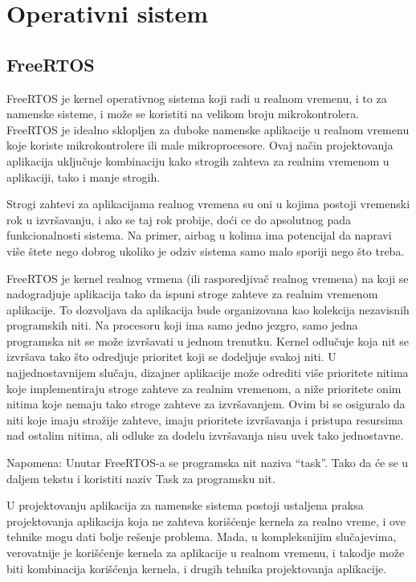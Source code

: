 \documentclass[a4paper,12pt, master]{etf}
\begin{document}
	\chapter{Operativni sistem}

	\section{FreeRTOS}

	FreeRTOS je kernel operativnog sistema koji radi u realnom vremenu, i to za
	namenske sisteme, i mo\v{z}e se koristiti na velikom broju mikrokontrolera.
	FreeRTOS je idealno sklopljen za duboke namenske aplikacije u realnom
	vremenu koje koriste mikrokontrolere ili male mikroprocesore. Ovaj
	na\v{c}in projektovanja aplikacija uklju\v{c}uje kombinaciju kako strogih
	zahteva za realnim vremenom u aplikaciji, tako i manje strogih.

	Strogi zahtevi za aplikacijama realnog vremena su oni u kojima postoji
	vremenski rok u	izvr\v{s}avanju, i ako se taj rok probije, do\'{c}i ce do
	apsolutnog pada funkcionalnosti sistema. Na primer, airbag u kolima ima
	potencijal da napravi vi\v{s}e \v{s}tete nego dobrog ukoliko je	odziv
	sistema samo malo sporiji nego \v{s}to treba.

	FreeRTOS je kernel realnog vrmena (ili rasporedjiva\v{c} realnog
	vremena) na	koji se nadogradjuje aplikacija tako da ispuni stroge zahteve
	za realnim vremenom aplikacije. To dozvoljava da aplikacija bude
	organizovana kao kolekcija nezavisnih programskih niti. Na procesoru koji
	ima samo jedno jezgro, samo jedna programska nit se mo\v{z}e izvr\v{s}avati
	u jednom trenutku. Kernel odlu\v{c}uje koja nit se izvr\v{s}ava tako
	\v{s}to odredjuje prioritet koji se dodeljuje svakoj niti. U
	najjednostavnijem slu\v{c}aju, dizajner aplikacije mo\v{z}e odrediti
	vi\v{s}e prioritete nitima koje implementiraju stroge zahteve za realnim
	vremenom, a ni\v{z}e prioritete onim nitima koje nemaju tako stroge zahteve
	za izvr\v{s}avanjem. Ovim bi se osiguralo da niti koje imaju stro\v{z}ije
	zahteve, imaju prioritete izvr\v{s}avanja i pristupa resursima nad ostalim
	nitima, ali odluke za dodelu izvr\v{s}avanja nisu uvek tako jednostavne.

	Napomena: Unutar FreeRTOS-a se programska nit naziva ``task''. Tako da
	\'{c}e se u daljem tekstu i koristiti naziv Task za programsku nit.

	U projektovanju aplikacija za namenske sistema postoji ustaljena praksa
	projektovanja aplikacija koja ne zahteva kori\v{s}\'{c}enje kernela za
	realno vreme, i ove tehnike mogu dati bolje re\v{s}enje problema. Mada, u
	kompleksnijim slu\v{c}ajevima, verovatnije je kori\v{s}\'{c}enje kernela za
	aplikacije u realnom vremenu, i takodje mo\v{z}e biti kombinacija
	kori\v{s}\'{c}enja kernela, i drugih tehnika projektovanja aplikacije.
\end{document}
